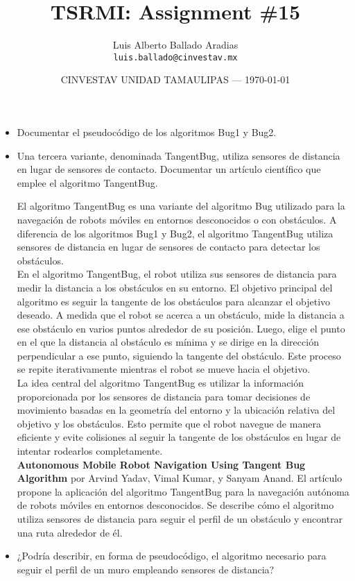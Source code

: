 \documentclass{article}
\title{TSRMI: Assignment \#15} %
\author{Luis Alberto Ballado Aradias\\ \texttt{luis.ballado@cinvestav.mx}} %
\date{CINVESTAV UNIDAD TAMAULIPAS --- \today} %
\begin{document}
\maketitle %


\begin{itemize}
\item Documentar el pseudocódigo de los algoritmos Bug1 y Bug2.

  
  

\item Una tercera variante, denominada TangentBug, utiliza sensores de distancia en lugar de sensores de contacto. Documentar un artículo científico que emplee el algoritmo TangentBug.

  El algoritmo TangentBug es una variante del algoritmo Bug utilizado para la navegación de robots móviles en entornos desconocidos o con obstáculos. A diferencia de los algoritmos Bug1 y Bug2, el algoritmo TangentBug utiliza sensores de distancia en lugar de sensores de contacto para detectar los obstáculos.\\

  En el algoritmo TangentBug, el robot utiliza sus sensores de distancia para medir la distancia a los obstáculos en su entorno. El objetivo principal del algoritmo es seguir la tangente de los obstáculos para alcanzar el objetivo deseado. A medida que el robot se acerca a un obstáculo, mide la distancia a ese obstáculo en varios puntos alrededor de su posición. Luego, elige el punto en el que la distancia al obstáculo es mínima y se dirige en la dirección perpendicular a ese punto, siguiendo la tangente del obstáculo. Este proceso se repite iterativamente mientras el robot se mueve hacia el objetivo.\\

  La idea central del algoritmo TangentBug es utilizar la información proporcionada por los sensores de distancia para tomar decisiones de movimiento basadas en la geometría del entorno y la ubicación relativa del objetivo y los obstáculos. Esto permite que el robot navegue de manera eficiente y evite colisiones al seguir la tangente de los obstáculos en lugar de intentar rodearlos completamente.\\

  \textbf{Autonomous Mobile Robot Navigation Using Tangent Bug Algorithm} por Arvind Yadav, Vimal Kumar, y Sanyam Anand. El artículo propone la aplicación del algoritmo TangentBug para la navegación autónoma de robots móviles en entornos desconocidos. Se describe cómo el algoritmo utiliza sensores de distancia para seguir el perfil de un obstáculo y encontrar una ruta alrededor de él.

  
\item ¿Podría describir, en forma de pseudocódigo, el algoritmo necesario para seguir el perfil de un muro empleando sensores de distancia?



\end{itemize}
\end{document}
